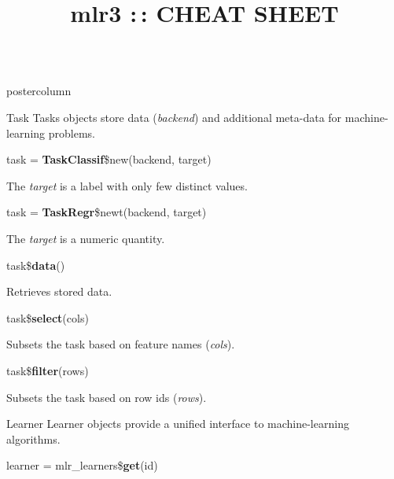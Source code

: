 \documentclass{beamer}
\title{mlr3 :\,: CHEAT SHEET} %
\newlength{\columnheight} %
\begin{document}
\begin{frame}[fragile]{}
\begin{columns}
	\begin{column}{.31\textwidth}
		\begin{beamercolorbox}[center]{postercolumn}
			\begin{minipage}{.98\textwidth}
				\parbox[t][\columnheight]{\textwidth}{				
					\begin{myblock}{Task}
						Tasks objects store data (\textit{backend}) and additional meta-data for machine-learning problems.
						\\
						\begin{codebox}
							task = \textbf{TaskClassif}\$new(backend, target)
						\end{codebox}
						\hspace*{1ex}The \textit{target} is a label with only few distinct values.
						\\
						\begin{codebox}
							task = \textbf{TaskRegr}\$newt(backend, target)
						\end{codebox}
						\hspace*{1ex}The \textit{target} is a numeric quantity.
						\\
						\begin{codebox}
							task\$\textbf{data}()
						\end{codebox}
						\hspace*{1ex}Retrieves stored data.
						\\
						\begin{codebox}
							task\$\textbf{select}(cols)
						\end{codebox}
						\hspace*{1ex}Subsets the task based on feature names (\textit{cols}).
						\\
						\begin{codebox}
							task\$\textbf{filter}(rows)
						\end{codebox}
						\hspace*{1ex}Subsets the task based on row ids (\textit{rows}).
					\end{myblock}
					\begin{myblock}{Learner}
						Learner objects provide a unified interface to machine-learning algorithms.
						\\
						\begin{codebox}
							learner = mlr\_learners\$\textbf{get}(id)
						\end{codebox}

\end{myblock}}
\end{minipage}
\end{beamercolorbox}
\end{column}
\end{columns}
\end{frame}
\end{document}
